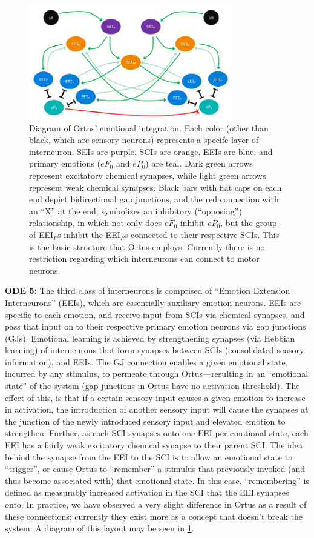 \documentclass[letterpaper]{article}
\begin{document}
\begin{figure}[t]
\begin{center}
\includegraphics[width=3.5in]{images/ortus_diagram.png}
\caption{Diagram of Ortus' emotional integration. Each color (other than black, which are sensory neurons) represents a specifc layer of interneuron. SEIs are purple, SCIs are orange, EEIs are blue, and primary emotions ($eF_0$ and $eP_0$) are teal. Dark green arrows represent excitatory chemical synapses, while light green arrows represent weak chemical synapses. Black bars with flat caps on each end depict bidirectional gap junctions, and the red connection with an ``X'' at the end, symbolizes an inhibitory (``opposing'') relationship, in which not only does $eF_0$ inhibit $eP_0$, but the group of EEI$_F$s inhibit the EEI$_P$s connected to their respective SCIs. This is the basic structure that Ortus employs. Currently there is no restriction regarding which interneurons can connect to motor neurons.}
\label{diagram}
\end{center}
\end{figure}

\textbf{ODE 5:} The third class of interneurons is comprised of ``Emotion Extension Interneurons'' (EEIs), which are essentially auxiliary emotion neurons.
EEIs are specific to each emotion, and receive input from SCIs via chemical synapses, and pass that input on to their respective primary emotion neurons via gap junctions (GJs).
Emotional learning is achieved by strengthening synapses (via Hebbian learning) of interneurons that form synapses between SCIs (consolidated sensory information), and EEIs.
The GJ connection enables a given emotional state, incurred by any stimulus, to permeate through Ortus---resulting in an ``emotional state'' of the system (gap junctions in Ortus have no activation threshold).
The effect of this, is that if a certain sensory input causes a given emotion to increase in activation, the introduction of another sensory input will cause the synapses at the junction of the newly introduced sensory input and elevated emotion to strengthen. 
Further, as each SCI synapses onto one EEI per emotional state, each EEI has a fairly weak excitatory chemical synapse to their parent SCI.
The idea behind the synapse from the EEI to the SCI is to allow an emotional state to ``trigger'', or cause Ortus to ``remember'' a stimulus that previously invoked (and thus become associated with) that emotional state.
In this case, ``remembering'' is defined as measurably increased activation in the SCI that the EEI synapses onto.
In practice, we have observed a very slight difference in Ortus as a result of these connections; currently they exist more as a concept that doesn't break the system. A diagram of this layout may be seen in \ref{diagram}.
\end{document}
